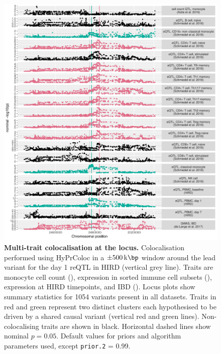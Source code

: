 \begin{figure}
    \centering
    \includegraphics[width=1.0\textwidth,page=1]{mainmatter/figures/chapter_03/perform_coloc.gene_ENSG00000138031.locusPlot.pdf}
    \caption{
        \textbf{Multi-trait colocalisation at the  locus.}
        Colocalisation performed using {HyPrColoc} \autocite{foley2019FastEfficientColocalization} in a $\pm \SI{500}{\kilo\bp}$ window around the lead variant for the day 1  \gls{reQTL} in \gls{HIRD} (vertical grey line).
        Traits are monocyte cell count (\textcite{astle2016AllelicLandscapeHuman}),  expression in sorted immune cell subsets (\textcite{schmiedel2018ImpactGeneticPolymorphisms}),  expression at \gls{HIRD} timepoints, and \gls{IBD} (\textcite{delange2017GenomewideAssociationStudy}).
        Locus plots show summary statistics for 1054 variants present in all datasets.
        Traits in red and green represent two distinct clusters each hypothesised to be driven by a shared causal variant (vertical red and green lines).
        Non-colocalising traits are shown in black.
        Horizontal dashed lines show nominal $p = 0.05$.
        Default values for priors and algorithm parameters used, except \texttt{prior.2} = 0.99.
    }
    \label{fig:hird_reQTL_coloc_ADCY3_locusPlot}
\end{figure}

